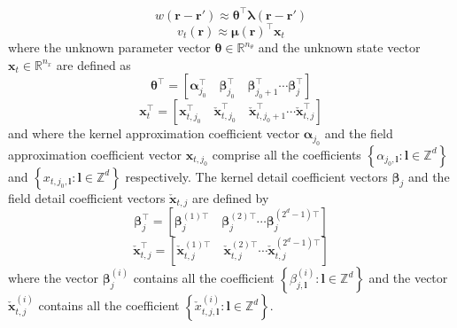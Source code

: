 \documentclass[journal,a4paper]{IEEEtran}
\begin{document}
 \begin{equation}
 w\left(\mathbf{r}-\mathbf{r'}\right)\approx \boldsymbol\theta^\top\boldsymbol\lambda\left(\mathbf{r}-\mathbf{r'}\right)
\label{eq:KernelFiniteExpansion}
\end{equation}
\begin{equation}
 v_t\left(\mathbf{r}\right)\approx\boldsymbol\mu\left(\mathbf{r}\right)^\top\mathbf{x}_t
\label{eq:FieldFiniteExpansion}
\end{equation}
where the unknown parameter vector $ \boldsymbol\theta \in \mathbb{R}^{n_{\theta}}$ and the unknown state vector $ \mathbf{x}_t \in \mathbb{R}^{n_x}$ are defined as 
\begin{equation}
 \boldsymbol\theta^\top=\left[ \boldsymbol\alpha_{j_0}^\top \quad \boldsymbol\beta_{j_0}^\top \quad \boldsymbol\beta_{j_0+1}^\top \cdots \boldsymbol\beta_{j}^\top\right] 
\label{KernelWeights}
\end{equation}
\begin{equation}
 \mathbf{x}_{t}^\top=\left[\mathbf{x}_{t,j_{0}}^\top \quad  \check{\mathbf{x}}_{t,j_{0}}^\top \quad  \check{\mathbf{x}}_{t,j_{0}+1}^\top \cdots \check{\mathbf{x}}_{t,j}^\top\right] 
\label{FieldWeights}
\end{equation}
and where the kernel approximation coefficient vector $\boldsymbol \alpha_{j_0}$  and the field approximation coefficient vector $\mathbf{x}_{t,j_{0}}$ comprise all the coefficients $\left\lbrace\alpha_{j_0,\mathbf l}:\mathbf{l} \in \mathbb{Z}^d \right\rbrace $ and $\left\lbrace x_{t,j_0,\mathbf l}: \mathbf{l} \in \mathbb{Z}^d\right\rbrace$ respectively. The kernel detail coefficient vectors $\boldsymbol \beta_{j}$ and the field detail coefficient vectors $\check{\mathbf{x}}_{t,j}$ are defined by
\begin{equation}
 \boldsymbol\beta_{j}^\top=\left[\boldsymbol\beta_{j}^{(1)\top} \quad \boldsymbol\beta_{j}^{(2)\top} \cdots \boldsymbol\beta_{j}^{(2^d-1)\top}\right] 
\end{equation}
\begin{equation}
\check{\mathbf{x}}_{t,j}^\top=\left[\check{\mathbf{x}}_{t,j}^{(1)\top} \quad \check{\mathbf{x}}_{t,j}^{(2)\top} \cdots \check{\mathbf{x}}_{t,j}^{(2^d-1)\top}\right] 
\end{equation}
where the vector $\boldsymbol\beta_{j}^{(i)}$ contains all the coefficient $\left\lbrace \beta_{j,\mathbf l}^{(i)} :\mathbf{l} \in \mathbb{Z}^d\right\rbrace$ and the vector $\check{\mathbf{x}}_{t,j}^{(i)}$ contains all the coefficient $\left\lbrace  \check x_{t,j,\mathbf l}^{(i)}:\mathbf{l} \in \mathbb{Z}^d\right\rbrace$. 
\end{document}
